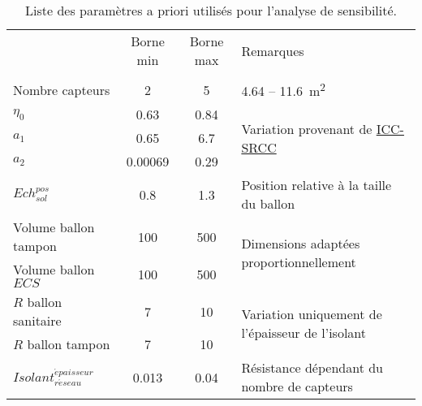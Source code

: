 \begin{table}
\centering
\caption{Liste des paramètres a priori utilisés pour l’analyse de sensibilité.}
\label{tab:facteur_sensibilite}
\begin{tabular}{l c c l}
  \toprule
  \addlinespace
                                               & Borne min     & Borne max   & Remarques                                                            \\
  \addlinespace
  \multicolumn{4}{l}{\bm{$SSC$}}                                                                           \\
  \midrule
  Nombre capteurs                              & \num{2}       & \num{5}     & \num{4.64} -- \SI{11.6}{\metre\squared}                              \\
  $\eta_{0}$                                   & \num{0.63}    & \num{0.84}  & \multirow{3}{*}{Variation provenant de \href{www.solar-rating.org}{ICC-SRCC}}   \\
  $a_{1}$                                      & \num{0.65}    & \num{6.7}   &                                                                      \\
  $a_{2}$                                      & \num{0.00069} & \num{0.29}  &                                                                      \\
  $Ech_{sol}^{pos}$                            & \num{0.8}     & \num{1.3}   & Position relative à la taille du ballon                              \\
  Volume ballon tampon                         & \num{100}     & \num{500}   & \multirow{2}{*}{Dimensions adaptées proportionnellement}             \\
  Volume ballon $ECS$                          & \num{100}     & \num{500}   &                                                                      \\
  $R$ ballon sanitaire                         & \num{7}       & \num{10}    & \multirow{2}{*}{Variation uniquement de l’épaisseur de l’isolant}    \\
  $R$ ballon tampon                            & \num{7}       & \num{10}    &                                                                      \\
  $Isolant_{r\acute eseau}^{\acute epaisseur}$ & \num{0.013}   & \num{0.04}  & Résistance dépendant du nombre de capteurs                           \\

\end{tabular}
\end{table}

